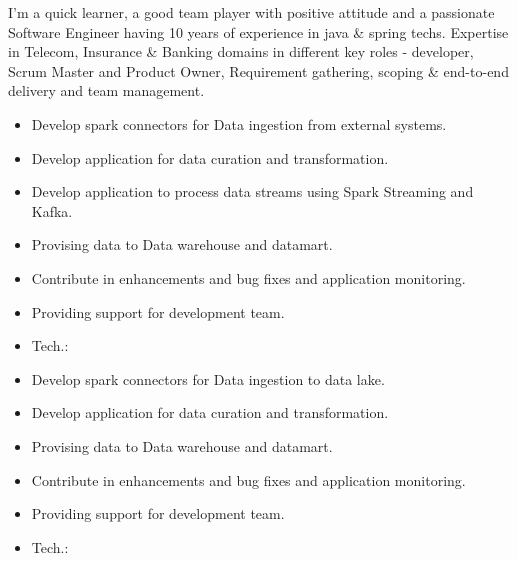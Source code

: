 \documentclass[9pt,a4paper,ragged2e,withhyper]{altacv}
\begin{document}
\begin{paracol}{2}

\begin{justify}
I’m a quick learner, a good team player with positive attitude and a passionate Software Engineer having 10 years of experience in java \& spring techs. Expertise in Telecom, Insurance \& Banking domains in different key roles - developer, Scrum Master and Product Owner, Requirement gathering, scoping \& end-to-end delivery and team management. 
\end{justify}


\begin{itemize}
\item Develop spark connectors for Data ingestion from external systems.
\item Develop application for data curation and transformation.
\item Develop application to process data streams using Spark Streaming and Kafka.
\item Provising data to Data warehouse and datamart.
\item Contribute in enhancements and bug fixes and application monitoring.
\item Providing support for development team.
\item Tech.:       
\end{itemize}

\divider

\begin{itemize}
\item Develop spark connectors for Data ingestion to data lake. 
\item Develop application for data curation and transformation.
\item Provising data to Data warehouse and datamart.
\item Contribute in enhancements and bug fixes and application monitoring.
\item Providing support for development team.
\item Tech.:    
\end{itemize}


\end{paracol}
\end{document}
